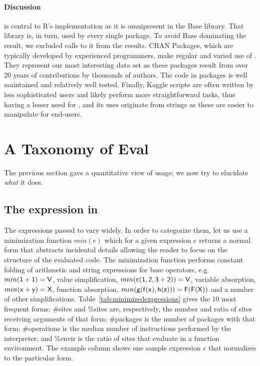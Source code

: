 \documentclass[review,screen,acmsmall,anonymous=true]{acmart}
\begin{document}
\paragraph{Discussion}
\Eval is central to R's implementation as it is omnipresent in the Base library.
That library is, in turn, used by every single package. To avoid Base dominating
the result, we excluded calls to it from the results. CRAN Packages, which are
typically developed by experienced programmers, make regular and varied use of
\eval. They represent our most interesting data set as these packages result
from over 20 years of contributions by thousands of authors. The code in
packages is well maintained and relatively well tested. Finally, Kaggle scripts
are often written by less sophisticated users and likely perform more
straightforward tasks, thus having a lesser need for \eval, and its uses
originate from strings as these are easier to manipulate for end-users.

\section{A Taxonomy of Eval}

The previous section gave a quantitative view of \eval usage; we now try to
elucidate \emph{what} it does.

\subsection{The expression in \eval} \label{sec:minimized}


The expressions passed to \eval vary widely. In order to categorize them, let us
use a minimization function $min(e)$ which for a given expression $e$ returns a
normal form that abstracts incidental details allowing the reader to focus on
the structure of the evaluated code. The minimization function performs constant
folding of arithmetic and string expressions for base operators, e.g.
$min({\sf 1+1})={\sf V}$, value simplification, $min({\sf c(1,2,3+2)})={\sf V}$,
variable absorption, $min({\sf x+y})={\sf X}$, function absorption,
$min({\sf g(f(x),h(z))})={\sf F(F(X))}$ and a number of other simplifications.
Table~\ref{tab:minimizedexpressions} gives the 10 most frequent forms; \#sites
and \%sites are, respectively, the number and ratio of sites receiving arguments
of that form; \#packages is the number of packages with that form; \#operations
is the median number of instructions performed by the interpreter; and \%envir
is the ratio of sites that evaluate in a function environment. The example
column shows one sample expression $e$ that normalizes to the particular form.
\end{document}
